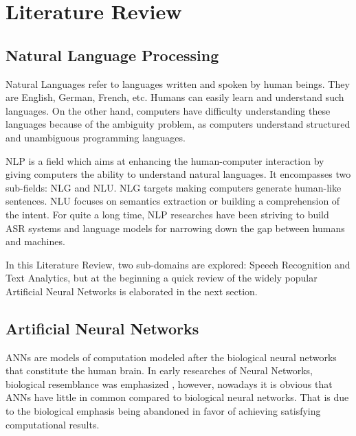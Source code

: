 \chapter{Literature Review}
\label{chap:bg}


\section{Natural Language Processing} 
\label{bg:s1}


Natural Languages refer to languages written and spoken by human beings. They are English, German, French, etc. Humans can easily learn and understand such languages. On the other hand, computers have difficulty understanding these languages because of the ambiguity problem, as computers understand structured and unambiguous programming languages. 

\ac{NLP} is a field which aims at enhancing the human-computer interaction by giving computers the ability to understand natural languages. It encompasses two sub-fields: \ac{NLG} and \ac{NLU}. \ac{NLG} targets making computers generate human-like sentences. \ac{NLU} focuses on semantics extraction or building a comprehension of the intent. For quite a long time, \ac{NLP} researches have been striving to build \ac{ASR} systems and language models for narrowing down the gap between humans and machines.


In this Literature Review, two sub-domains are explored: Speech Recognition and Text Analytics, but at the beginning a quick review of the widely popular Artificial Neural Networks is elaborated in the next section.


























\section{Artificial Neural Networks} 
\label{bg:s2} 

\ac{ANN}s are models of computation modeled after the biological neural networks that constitute the human brain. 
In early researches of Neural Networks, biological resemblance was emphasized \cite{hopfield1982neural} \cite{jordan1986serial} \cite{elman1990finding}, however, nowadays it is obvious that \ac{ANN}s have little in common compared to biological neural networks. That is due to the biological emphasis being abandoned in favor of achieving satisfying computational results.


